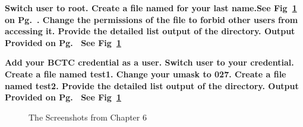 \documentclass[../CIT217_RHEL124_LabJournal.tex]{subfiles}
\begin{document}
\clearpage

\bf{Switch user to root. Create a file named for your last name.See Fig~\ref{ch6} on Pg.~\pageref{ch6}. Change the permissions of the file to forbid other users from accessing it. Provide the detailed list output of the directory.  Output Provided on Pg.~\pageref{ch6} See Fig~\ref{ch6}}
\hfill\break

\noindent{}
\bf{Add your BCTC credential as a user. Switch user to your credential. Create a file named test1. Change your umask to 027. Create a file named test2. Provide the detailed list output of the directory.  Output Provided on Pg.~\pageref{ch6} See Fig~\ref{ch6}}

\begin{figure}[!b]\centering
	\hfill
	\par\vspace{0.75cm} 
\caption{The Screenshots from Chapter 6}
\label{ch6}
\end{figure}


\end{document}
